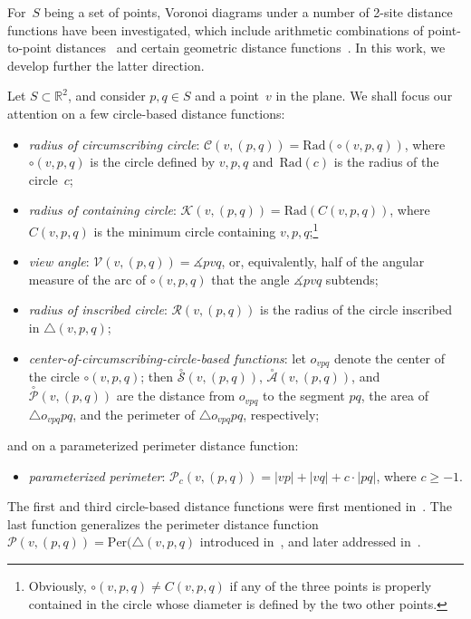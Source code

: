 \documentclass[10pt, conference, compsocconf]{IEEEtran}
\def\C{{\mathcal C}}
\def\K{{\mathcal K}}
\def\R{{\mathcal R}}
\def\PP{{\mathcal P}}
\def\V{{\mathcal V}}
\def\XA{{\stackrel{\circ}{\mathcal A}}}
\def\XP{{\stackrel{\circ}{\mathcal P}}}
\def\XS{{\stackrel{\circ}{\mathcal S}}}
\begin{document}
For~$S$ being a set of points, Voronoi diagrams under a number of 2-site
distance functions have been investigated, which include arithmetic
combinations of point-to-point distances~\cite{BDD02,VB10} and certain
geometric distance functions~\cite{BDD02,DE09,HB09}.  In this work, we
develop further the latter direction.

Let $S\subset \mathbb{R}^2$, and consider $p,q\in S$ and a point~$v$ in the
plane.  We shall focus our attention on a few circle-based distance
functions:
\begin{itemize}
\item \emph{radius of circumscribing circle}:
      $\C(v,(p,q)) = \mathrm{Rad}(\circ(v,p,q))$, where $\circ(v,p,q)$ is
      the circle defined by $v,p,q$ and~$\mathrm{Rad}(c)$ is the radius of
      the circle~$c$;
\item \emph{radius of containing circle}:
      $\K(v,(p,q)) = \mathrm{Rad}(C(v,p,q))$, where $C(v,p,q)$ is
      the minimum circle containing $v,p,q$;\footnote{
         Obviously, $\circ(v,p,q) \neq C(v,p,q)$ if any of the three
         points is properly contained in the circle whose diameter is
         defined by the two other points.
      }
\item \emph{view angle}:
      $\V(v,(p,q)) = \measuredangle{pvq}$, or, equivalently, half of the
      angular measure of the arc of $\circ(v,p,q)$ that the angle
      $\measuredangle{pvq}$ subtends;
\item \emph{radius of inscribed circle}:
      $\R(v,(p,q))$ is the radius of the circle inscribed in
      $\triangle(v,p,q)$;
\item \emph{center-of-circumscribing-circle-based functions}:
      let $o_{vpq}$ denote the center of the circle $\circ(v,p,q)$; then
      $\XS(v,(p,q))$, $\XA(v,(p,q))$, and $\XP(v,(p,q))$ are the
      distance from $o_{vpq}$ to the segment $pq$, the area of
      $\triangle o_{vpq}pq$, and the perimeter of $\triangle o_{vpq}pq$,
      respectively;
\end{itemize}
and on a parameterized perimeter distance function:
\begin{itemize}
\item \emph{parameterized perimeter}:
       $\PP_c(v,(p,q))=|vp|+|vq|+c \cdot |pq|$, where $c \geq -1$.
\end{itemize}
The first and third circle-based distance functions were first mentioned
in~\cite{H05}.  The last function generalizes the perimeter distance function
$\PP(v,(p,q)) = \mathrm{Per}(\triangle(v,p,q)$ introduced in~\cite{BDD02},
and later addressed in~\cite{DE09,HB09}.
\end{document}
